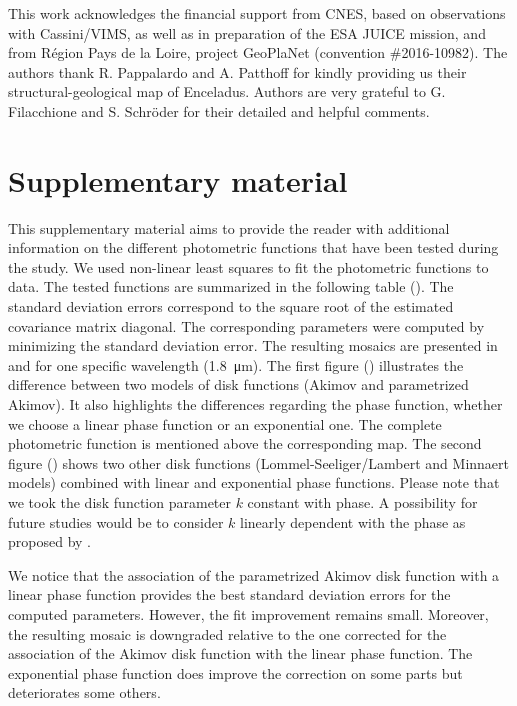 \documentclass{arxiv-icarus}
\begin{document}
This work acknowledges the financial support from CNES, based on observations with Cassini/VIMS, as well as in preparation of the ESA JUICE mission, and from R\'{e}gion Pays de la Loire, project GeoPlaNet (convention \#2016-10982). The authors thank R. Pappalardo and A. Patthoff for kindly providing us their structural-geological map of Enceladus. Authors are very grateful to G. Filacchione and S. Schr\"{o}der for their detailed and helpful comments.




\onecolumn
\appendix
\section{Supplementary material}
\setcounter{figure}{0}

This supplementary material aims to provide the reader with additional information on the different photometric functions that have been tested during the study. We used non-linear least squares to fit the photometric functions to data. The tested functions are summarized in the following table (). The standard deviation errors correspond to the square root of the estimated covariance matrix diagonal. The corresponding parameters were computed by minimizing the standard deviation error. The resulting mosaics are presented in  and  for one specific wavelength (\SI{1.8}{\um}). The first figure () illustrates the difference between two models of disk functions (Akimov and parametrized Akimov). It also highlights the differences regarding the phase function, whether we choose a linear phase function or an exponential one. The complete photometric function is mentioned above the corresponding map. The second figure () shows two other disk functions (Lommel-Seeliger/Lambert and Minnaert models) combined with linear and exponential phase functions.
Please note that we took the disk function parameter $k$ constant with phase. A possibility for future studies would be to consider $k$ linearly dependent with the phase as proposed by \cite{Schroder2017}.

We notice that the association of the parametrized Akimov disk function with a linear phase function provides the best standard deviation errors for the computed parameters. However, the fit improvement remains small. Moreover, the resulting mosaic is downgraded relative to the one corrected for the association of the Akimov disk function with the linear phase function. The exponential phase function does improve the correction on some parts but deteriorates some others.
\end{document}
